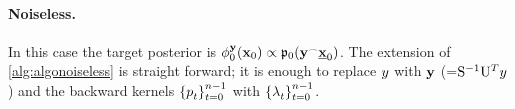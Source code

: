 \vspace{-.1cm}
\paragraph*{Noiseless.} In this case the target posterior is $\filter{0}{\ltrmeas}{\ltrstate_0} \propto \bwmargV{0}{\cat{\ltrmeas}{\ltrbottomstate_0}}$.
The extension of \cref{alg:algonoiseless} is straight forward;
it is enough to replace $y$ with $\mathbf{y}$ (=$\mathrm{S}^{-1} \mathrm{U}^T y$) and the backward kernels $\left\{ \bwtrans{}{t}{}{} \right\}_{t = 0} ^{n-1}$ with $\left\{ \bwtransV{}{t}{}{} \right\}_{t = 0} ^{n-1}$.
\vspace{-.1cm}
